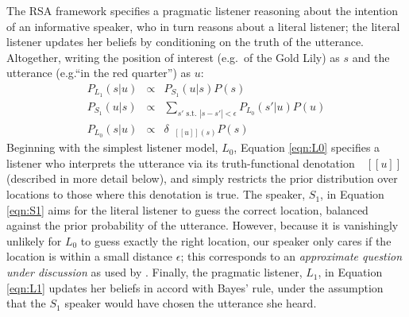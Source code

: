 \documentclass[10pt,letterpaper]{article}
\newcommand{\denote}[1]{\mbox{ $[\![ #1 ]\!]$}}
\begin{document}
The RSA framework specifies a pragmatic listener reasoning about the intention of an informative speaker, who in turn reasons about a literal listener; the literal listener updates her beliefs by conditioning on the truth of the utterance.
Altogether, writing the position of interest (e.g.~of the Gold Lily) as $s$ and the utterance (e.g.``in the red quarter'') as $u$:
\begin{eqnarray}
P_{L_1}(s|u)&\propto&P_{S_1}(u | s) P(s) \label{eqn:L1}\\
P_{S_1}(u|s)&\propto&\sum_{s' \text{ s.t. } |s-s'|<\epsilon} P_{L_0}(s'|u) P(u)\label{eqn:S1}\\
P_{L_0}(s|u)&\propto& \delta_{\denote{u}(s)} P(s)\label{eqn:L0}
\end{eqnarray}
Beginning with the simplest listener model, $L_0$, Equation \ref{eqn:L0} specifies a listener who interprets the utterance via its truth-functional denotation $\denote{u}$ (described in more detail below), and simply restricts the prior distribution over locations to those where this denotation is true.
The speaker, $S_1$, in Equation \ref{eqn:S1} aims for the literal listener to guess the correct location, balanced against the prior probability of the utterance. However, because it is vanishingly unlikely for $L_0$ to guess exactly the right location, our speaker only cares if the location is within a small distance $\epsilon$; this corresponds to an \emph{approximate question under discussion} as used by .
Finally, the pragmatic listener, $L_1$, in Equation \ref{eqn:L1} updates her beliefs in accord with Bayes' rule, under the assumption that the $S_1$ speaker would have chosen the utterance she heard.
\end{document}
